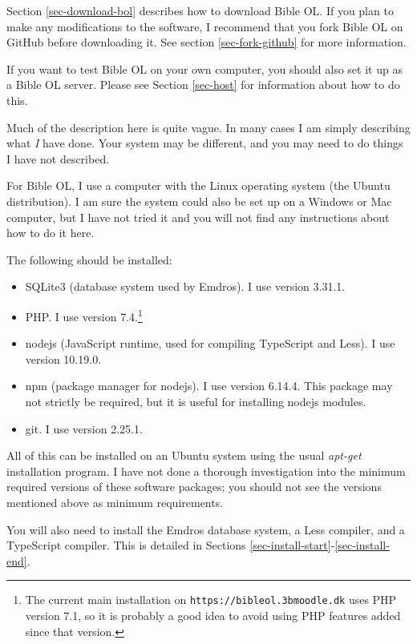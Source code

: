 \documentclass[11pt,oneside,a4paper]{memoir}
\begin{document}
Section \ref{sec-download-bol} describes how to download Bible OL. If you plan to make any
modifications to the software, I recommend that you fork Bible OL on GitHub
before downloading it. See section \ref{sec-fork-github} for more information.

If you want to test Bible OL on your own computer, you should also set it up as a Bible OL server.
Please see Section \ref{sec-host} for information about how to do this.

Much of the description here is quite vague. In many cases I am simply describing what \emph{I} have
done. Your system may be different, and you may need to do things I have not described.

For Bible OL, I use a computer with the Linux operating system (the
Ubuntu distribution). I am sure the system could also be set up on a
Windows or Mac computer, but I have not tried it and you will not find any
instructions about how to do it here.

The following should be installed:

\begin{itemize}
\item SQLite3 (database system used by Emdros). I use version 3.31.1.
\item PHP. I use version 7.4.\footnote{The current main installation on
    \texttt{https://bibleol.3bmoodle.dk} uses PHP version 7.1, so it is probably a good
    idea to avoid using PHP features added since that version.}
\item nodejs (JavaScript runtime, used for compiling TypeScript and Less). I use version
  10.19.0.
\item npm (package manager for nodejs). I use version 6.14.4.
  This package may not strictly be required, but it is useful for installing nodejs modules.
\item git. I use version 2.25.1.
\end{itemize}

All of this can be installed on an Ubuntu system using the usual \emph{apt-get} installation
program. I have not done a thorough investigation into the minimum required versions of these
software packages; you should not see the versions mentioned above as minimum requirements.

You will also need to install the Emdros database system, a Less compiler, and a TypeScript
compiler. This is detailed in Sections \ref{sec-install-start}-\ref{sec-install-end}.
\end{document}
